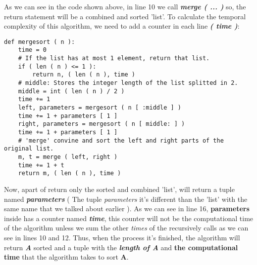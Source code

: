As we can see in the code shown above, in line 10 we call {\bfseries\itshape merge ( ... )} so, the return statement will be a combined and sorted 'list'. To calculate the temporal complexity of this algorithm, we need to add a counter in each line {\bfseries\itshape ( time )}: \hfill \break

\begin{lstlisting}
def mergesort ( n ):
    time = 0
    # If the list has at most 1 element, return that list.
    if ( len ( n ) <= 1 ):
        return n, ( len ( n ), time )
    # middle: Stores the integer length of the list splitted in 2.
    middle = int ( len ( n ) / 2 )
    time += 1
    left, parameters = mergesort ( n [ :middle ] )
    time += 1 + parameters [ 1 ]
    right, parameters = mergesort ( n [ middle: ] )
    time += 1 + parameters [ 1 ]
    # 'merge' convine and sort the left and right parts of the original list.
    m, t = merge ( left, right )
    time += 1 + t
    return m, ( len ( n ), time )
\end{lstlisting} \hfill

Now, apart of return only the sorted and combined 'list', will return a tuple named {\bfseries\itshape parameters} ( The tuple {\itshape parameters} it's different than the 'list' with the same name that we talked about earlier
).  As we can see in line 16, {\bfseries parameters} inside has a counter named {\bfseries\itshape time}, this counter will not be the computational time of the algorithm unless we sum the other {\itshape times} of the recursively calls as we can see in lines 10 and 12. Thus, when the process it's finished, the algorithm will return {\bfseries\itshape A} sorted and a tuple with the {\bfseries\itshape length of A} and {\bfseries the computational time} that the algorithm takes to sort {\bfseries A}. \hfill \break

{\bfseries\itshape\color{armygreen}{Observation:}} {\itshape{}} \hfill \break

{\bfseries\itshape\color{armygreen}{Observation:}} {\itshape{}} 

\pagebreak
